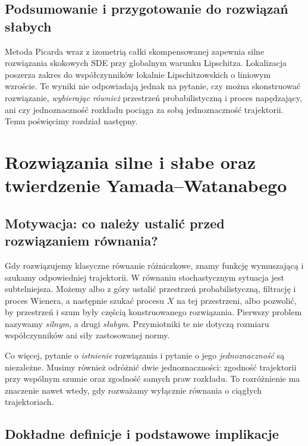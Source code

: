 \documentclass[11pt,a4paper,oneside]{report}
\numberwithin{equation}{chapter}
\theoremstyle{plain}
\theoremstyle{definition}
\theoremstyle{remark}
\begin{document}
\section{Podsumowanie i przygotowanie do rozwiązań słabych}
Metoda Picarda wraz z izometrią całki skompensowanej
zapewnia silne rozwiązania skokowych SDE przy globalnym
warunku Lipschitza. Lokalizacja poszerza zakres do
współczynników lokalnie Lipschitzowskich o liniowym
wzroście. Te wyniki nie odpowiadają jednak na pytanie,
czy można skonstruować rozwiązanie, \emph{wybierając również}
przestrzeń probabilistyczną i proces napędzający, ani czy
jednoznaczność rozkładu pociąga za sobą jednoznaczność
trajektorii. Temu poświęcimy rozdział następny.

\chapter{Rozwiązania silne i słabe oraz twierdzenie Yamada--Watanabego}
\label{ch:weak-strong-sde}

\section{Motywacja: co należy ustalić przed rozwiązaniem równania?}

Gdy rozwiązujemy klasyczne równanie różniczkowe, znamy funkcję
wymuszającą i szukamy odpowiedniej trajektorii. W równaniu
stochastycznym sytuacja jest subtelniejsza. Możemy albo z góry
ustalić przestrzeń probabilistyczną, filtrację i proces Wienera,
a następnie szukać procesu $X$ na tej przestrzeni, albo
pozwolić, by przestrzeń i szum były częścią konstruowanego
rozwiązania. Pierwszy problem nazywamy \emph{silnym}, a drugi
\emph{słabym}. Przymiotniki te nie dotyczą rozmiaru współczynników
ani siły zastosowanej normy.

Co więcej, pytanie o \emph{istnienie} rozwiązania i pytanie
o jego \emph{jednoznaczność} są niezależne. Musimy również
odróżnić dwie jednoznaczności: zgodność trajektorii przy
wspólnym szumie oraz zgodność samych praw rozkładu. To
rozróżnienie ma znaczenie nawet wtedy, gdy rozważamy wyłącznie
równania o ciągłych trajektoriach.

\section{Dokładne definicje i podstawowe implikacje}
\end{document}
